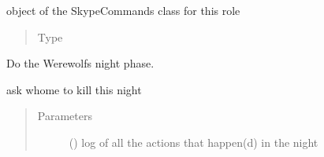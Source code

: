 \documentclass[letterpaper,10pt,english]{sphinxmanual}
\begin{document}
\begin{fulllineitems}
\begin{fulllineitems}
\begin{quote}
\begin{description}
\end{description}\end{quote}

\end{fulllineitems}



\begin{fulllineitems}
object of the SkypeCommands class for this role
\begin{quote}\begin{description}
\item[{Type}] \leavevmode
{\hyperref[\detokenize{chatwolf:chatwolf.skypecommands.SkypeCommands}]{}}

\end{description}\end{quote}

\end{fulllineitems}



\begin{fulllineitems}
\end{fulllineitems}



\begin{fulllineitems}
\end{fulllineitems}



\begin{fulllineitems}
Do the Werewolfs night phase.

ask whome to kill this night
\begin{quote}\begin{description}
\item[{Parameters}] \leavevmode
{} ({\hyperref[\detokenize{chatwolf:chatwolf.nightactions.Nightactions}]{}}) \textendash{} log of all the actions that happen(d) in the night

\end{description}\end{quote}

\end{fulllineitems}


\end{fulllineitems}
\end{document}
